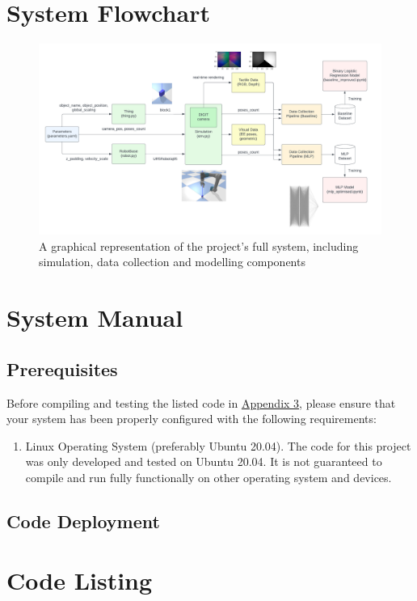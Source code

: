 \documentclass[11pt, a4paper]{report}
\begin{document}
 

\appendix
\printbibliography

\chapter{System Flowchart}\label{apdx:1}
\begin{figure}[H]
    \centering
    \includegraphics[width=\textwidth]{docs/Project Report/Media/appendix_project_architecture.png}
    \caption{A graphical representation of the project's full system, including simulation, data collection and modelling components}
    \label{fig:apdx1}
\end{figure}


\chapter{System Manual}\label{apdx:2}
\section{Prerequisites}\label{apdx:2.1}
Before compiling and testing the listed code in \hyperref[apdx:3]{Appendix 3}, please ensure that your system has been properly configured with the following requirements:
\begin{enumerate}
    \item Linux Operating System (preferably Ubuntu 20.04). The code for this project was only developed and tested on Ubuntu 20.04. It is not guaranteed to compile and run fully functionally on other operating system and devices.
\end{enumerate}

\section{Code Deployment}\label{apdx:2.2}


\chapter{Code Listing}\label{apdx:3}
\end{document}

